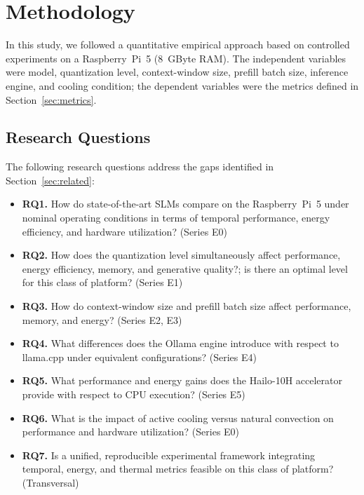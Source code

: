 \documentclass[acmsmall,natbib=false]{acmart}
\begin{document}
\section{Methodology}\label{sec:methodology}

In this study, we followed a quantitative empirical approach based on controlled
experiments on a Raspberry~Pi~5 (8~GByte RAM). The independent variables were 
model, quantization level, context-window size, prefill batch size, inference
engine, and cooling condition; the dependent variables were the metrics defined in
Section~\ref{sec:metrics}.

\subsection{Research Questions}\label{sec:questions}

The following research questions address the gaps identified in
Section~\ref{sec:related}:

\begin{itemize}
  \item \textbf{RQ1.} How do state-of-the-art SLMs compare on the
    Raspberry~Pi~5 under nominal operating conditions in terms of temporal
    performance, energy efficiency, and hardware utilization? (Series E0)
  \item \textbf{RQ2.} How does the quantization level simultaneously affect
    performance, energy efficiency, memory, and generative quality?; is
    there an optimal level for this class of platform? (Series E1)
  \item \textbf{RQ3.} How do context-window size and prefill batch
    size affect performance, memory, and energy? (Series E2, E3)
  \item \textbf{RQ4.} What differences does the Ollama engine introduce with
    respect to llama.cpp under equivalent configurations? (Series E4)
  \item \textbf{RQ5.} What performance and energy gains does the Hailo-10H
    accelerator provide with respect to CPU execution? (Series E5)
  \item \textbf{RQ6.} What is the impact of active cooling versus natural
    convection on performance and hardware utilization? (Series E0)
  \item \textbf{RQ7.} Is a unified, reproducible experimental framework
    integrating temporal, energy, and thermal metrics feasible on this class
    of platform? (Transversal)
\end{itemize}
\end{document}
